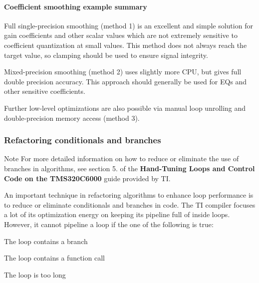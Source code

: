 \hypertarget{a00832_subsubsection__coefficient_smoothing_example_summary_}{}\paragraph{Coefficient smoothing example summary}\label{a00832_subsubsection__coefficient_smoothing_example_summary_}
 
\begin{DoxyItemize}
\item Full single-\/precision smoothing (method 1) is an excellent and simple solution for gain coefficients and other scalar values which are not extremely sensitive to coefficient quantization at small values. This method does not always reach the target value, so clamping should be used to ensure signal integrity.  
\item Mixed-\/precision smoothing (method 2) uses slightly more C\+PU, but gives full double precision accuracy. This approach should generally be used for E\+Qs and other sensitive coefficients.  
\item Further low-\/level optimizations are also possible via manual loop unrolling and double-\/precision memory access (method 3).  
\end{DoxyItemize}

\hypertarget{a00832_subsection__refactoring_conditionals_and_branches}{}\subsubsection{Refactoring conditionals and branches}\label{a00832_subsection__refactoring_conditionals_and_branches}
 \begin{DoxyNote}{Note}
For more detailed information on how to reduce or eliminate the use of branches in algorithms, see section 5. of the {\bfseries{Hand-\/\+Tuning Loops and Control Code on the T\+M\+S320\+C6000}} guide provided by TI.
\end{DoxyNote}
An important technique in refactoring algorithms to enhance loop performance is to reduce or eliminate conditionals and branches in code. The TI compiler focuses a lot of its optimization energy on keeping its pipeline full of inside loops. However, it cannot pipeline a loop if the one of the following is true\+:


\begin{DoxyItemize}
\item The loop contains a branch  
\item The loop contains a function call  
\item The loop is too long  
\end{DoxyItemize}

